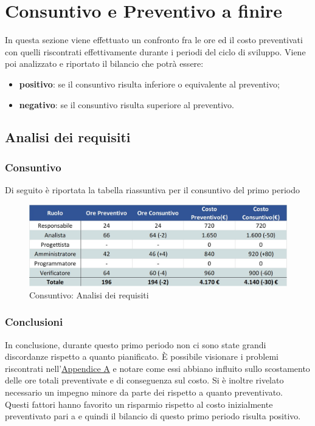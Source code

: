 \newpage
\section{Consuntivo e Preventivo a finire}

In questa sezione viene effettuato un confronto fra le ore ed il costo preventivati con quelli riscontrati effettivamente durante i periodi del ciclo di sviluppo.
Viene poi analizzato e riportato il bilancio che potrà essere:
\begin{itemize}
	\item \textbf{positivo}: se il consuntivo risulta inferiore o equivalente al preventivo;
	\item \textbf{negativo}: se il consuntivo risulta superiore al preventivo.
\end{itemize}

\subsection{Analisi dei requisiti}
\subsubsection{Consuntivo}
Di seguito è riportata la tabella riassuntiva per il consuntivo del primo periodo
\begin{figure}[h!]
	\centerline{\includegraphics[scale=0.55]{img/Preventivo/AnalisiRequisitiConsuntivo.jpg}}
	\caption{Consuntivo: Analisi dei requisiti}
\end{figure}

\subsubsection{Conclusioni}
In conclusione, durante questo primo periodo non ci sono state grandi discordanze rispetto a quanto pianificato. È possibile visionare i problemi riscontrati nell'\hyperref[RiscontroRischi]{Appendice A} e notare come essi abbiano influito sullo scostamento delle ore totali preventivate e di conseguenza sul costo. Si è inoltre rivelato necessario un impegno minore da parte dei \vers{} rispetto a quanto preventivato.\\
Questi fattori hanno favorito un risparmio rispetto al costo inizialmente preventivato pari a  e quindi il bilancio di questo primo periodo risulta positivo.
